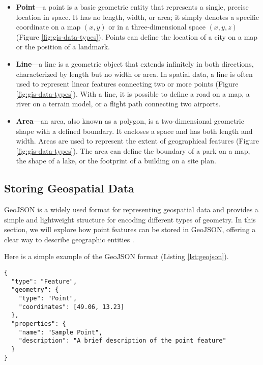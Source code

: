 \newpage

\begin{itemize}
    \item \textbf{Point}---a point is a basic geometric entity that represents a single, precise location in space. It has no length, width, or area; it simply denotes a specific coordinate on a map $(x, y)$ or in a three-dimensional space $(x, y ,z)$ (Figure \ref{fig:gis-data-types}). Points can define the location of a city on a map or the position of a landmark.
    \item \textbf{Line}---a line is a geometric object that extends infinitely in both directions, characterized by length but no width or area. In spatial data, a line is often used to represent linear features connecting two or more points (Figure \ref{fig:gis-data-types}). With a line, it is possible to define a road on a map, a river on a terrain model, or a flight path connecting two airports.
    \item \textbf{Area}---an area, also known as a polygon, is a two-dimensional geometric shape with a defined boundary. It encloses a space and has both length and width. Areas are used to represent the extent of geographical features (Figure \ref{fig:gis-data-types}). The area can define the boundary of a park on a map, the shape of a lake, or the footprint of a building on a site plan.
\end{itemize}

\subsection{Storing Geospatial Data}

GeoJSON is a widely used format for representing geospatial data and provides a simple and lightweight structure for encoding different types of geometry. In this section, we will explore how point features can be stored in GeoJSON, offering a clear way to describe geographic entities \cite{butler2016geojson}.

Here is a simple example of the GeoJSON format (Listing \ref{lst:geojson}).

\begin{lstlisting}[caption={Example of a GeoJSON point feature.}, label=lst:geojson]
{
  "type": "Feature",
  "geometry": {
    "type": "Point",
    "coordinates": [49.06, 13.23]
  },
  "properties": {
    "name": "Sample Point",
    "description": "A brief description of the point feature"
  }
}
\end{lstlisting}

